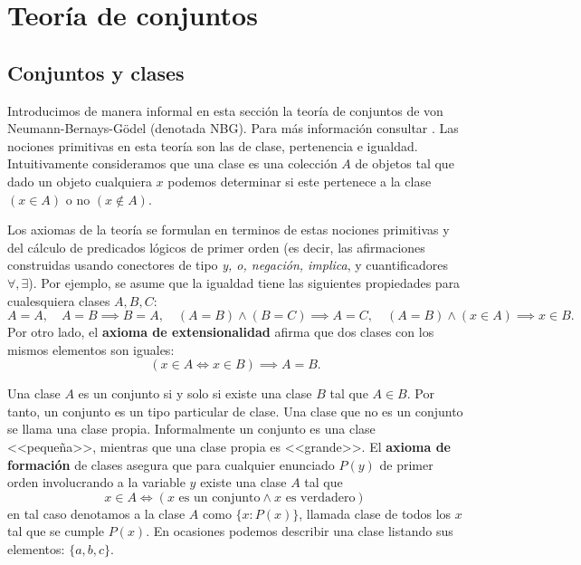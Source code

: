\appendix
\chapter{Teoría de conjuntos}

\section{Conjuntos y clases}

Introducimos de manera informal en esta sección la teoría de conjuntos de von Neumann-Bernays-Gödel (denotada NBG). Para más información consultar \cite{enwiki:1281064703}. Las nociones primitivas en esta teoría son las de clase, pertenencia e igualdad. Intuitivamente consideramos que una clase es una colección $A$ de objetos tal que dado un objeto cualquiera $x$ podemos determinar si este pertenece a la clase $(x \in A)$ o no $(x \notin A)$.

Los axiomas de la teoría se formulan en terminos de estas nociones primitivas y del cálculo de predicados lógicos de primer orden (es decir, las afirmaciones construidas usando conectores de tipo \textit{y, o, negación, implica}, y cuantificadores $\forall, \exists$). Por ejemplo, se asume que la igualdad tiene las siguientes propiedades para cualesquiera clases $A,B,C$:
\[
A=A,\quad A=B \implies B=A,\quad (A=B) \land (B=C) \implies A=C,\quad (A=B) \land (x \in A) \implies x \in B.
\]
Por otro lado, el \textbf{axioma de extensionalidad} afirma que dos clases con los mismos elementos son iguales:
\[
(x \in A \iff x \in B) \implies A = B.
\]

Una clase $A$ es un conjunto si y solo si existe una clase $B$ tal que $A \in B$. Por tanto, un conjunto es un tipo particular de clase. Una clase que no es un conjunto se llama una clase propia. Informalmente un conjunto es una clase <<pequeña>>, mientras que una clase propia es <<grande>>. El \textbf{axioma de formación} de clases asegura que para cualquier enunciado $P(y)$ de primer orden involucrando a la variable $y$ existe una clase $A$ tal que
\[
x \in A \iff (x \text{ es un conjunto} \land x \text{ es verdadero})
\]
en tal caso denotamos a la clase $A$ como $\{x : P(x)\}$, llamada clase de todos los $x$ tal que se cumple $P(x)$. En ocasiones podemos describir una clase listando sus elementos: $\{a,b,c\}$.



